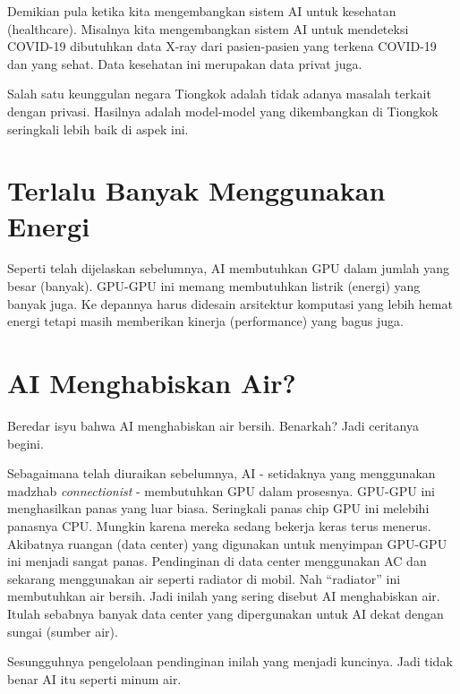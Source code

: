 Demikian pula ketika kita mengembangkan sistem AI untuk kesehatan
(healthcare).
Misalnya kita mengembangkan sistem AI untuk mendeteksi COVID-19
dibutuhkan data X-ray dari pasien-pasien yang terkena COVID-19
dan yang sehat.
Data kesehatan ini merupakan data privat juga.

Salah satu keunggulan negara Tiongkok adalah tidak adanya masalah
terkait dengan privasi. Hasilnya adalah model-model yang dikembangkan
di Tiongkok seringkali lebih baik di aspek ini.

\section{Terlalu Banyak Menggunakan Energi}
Seperti telah dijelaskan sebelumnya, AI membutuhkan GPU dalam jumlah yang besar
(banyak).
GPU-GPU ini memang membutuhkan listrik (energi) yang banyak juga.
Ke depannya harus didesain arsitektur komputasi yang lebih hemat energi
tetapi masih memberikan kinerja (performance) yang bagus juga.

\section{AI Menghabiskan Air?}
Beredar isyu bahwa AI menghabiskan air bersih. Benarkah?
Jadi ceritanya begini.

Sebagaimana telah diuraikan sebelumnya, AI - setidaknya yang menggunakan
madzhab \emph{connectionist} - membutuhkan GPU dalam prosesnya.
GPU-GPU ini menghasilkan panas yang luar biasa. Seringkali panas chip
GPU ini melebihi panasnya CPU. Mungkin karena mereka sedang bekerja keras
terus menerus.
Akibatnya ruangan (data center) yang digunakan untuk menyimpan GPU-GPU ini
menjadi sangat panas. 
Pendinginan di data center menggunakan AC dan sekarang menggunakan air
seperti radiator di mobil. Nah ``radiator'' ini membutuhkan air bersih.
Jadi inilah yang sering disebut AI menghabiskan air.
Itulah sebabnya banyak data center yang dipergunakan untuk AI dekat dengan
sungai (sumber air).

Sesungguhnya pengelolaan pendinginan inilah yang menjadi kuncinya.
Jadi tidak benar AI itu seperti minum air.
